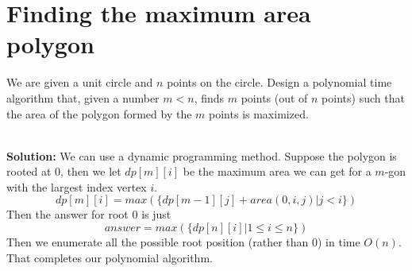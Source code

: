 \section{Finding the maximum area polygon}

We are given a unit circle and $n$ points on the circle. Design a polynomial time algorithm that, given a number $m<n$, finds $m$ points (out of $n$ points) such that the area of the polygon formed by the $m$ points is maximized.

\ \\{\bf Solution:} We can use a dynamic programming method. Suppose the polygon is rooted at 0, then we let $dp[m][i]$ be the maximum area we can get for a $m$-gon with the largest index vertex $i$. 
\[
dp[m][i] = max(\{dp[m-1][j]+area(0, i, j)|j<i\})
\]
Then the answer for root 0 is just
\[
answer = max(\{dp[n][i] | 1\le i\le n\}) 
\]
Then we enumerate all the possible root position (rather than 0) in time $O(n)$. That completes our polynomial algorithm.